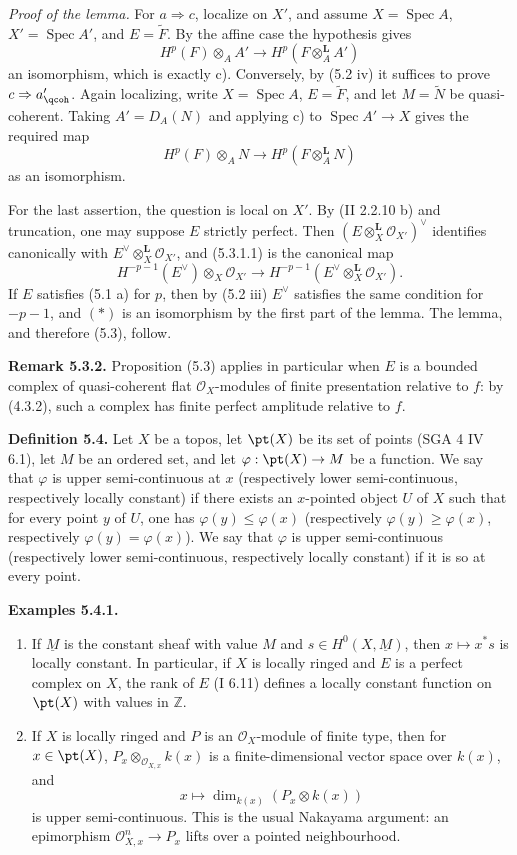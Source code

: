 \documentclass[11pt]{article}
\newcommand{\Spec}{\operatorname{Spec}}
\begin{document}
\emph{Proof of the lemma.} For \(a\Rightarrow c\), localize on \(X'\), and assume \(X=\Spec A\), \(X'=\Spec A'\), and \(E=\widetilde F\). By the affine case the hypothesis gives
\[
 H^p(F)\otimes_AA'
 \longrightarrow
 H^p(F\otimes_A^{\mathbf L}A')
\]
an isomorphism, which is exactly c). Conversely, by (5.2 iv) it suffices to prove \(c\Rightarrow a'_{\qcoh}\). Again localizing, write \(X=\Spec A\), \(E=\widetilde F\), and let \(M=\widetilde N\) be quasi-coherent. Taking \(A'=D_A(N)\) and applying c) to \(\Spec A'\to X\) gives the required map
\[
 H^p(F)\otimes_AN
 \longrightarrow
 H^p(F\otimes_A^{\mathbf L}N)
\]
as an isomorphism.

For the last assertion, the question is local on \(X'\). By (II 2.2.10 b) and truncation, one may suppose \(E\) strictly perfect. Then \((E\otimes_X^{\mathbf L}\mathcal O_{X'})^{\vee}\) identifies canonically with \(E^{\vee}\otimes_X^{\mathbf L}\mathcal O_{X'}\), and (5.3.1.1) is the canonical map
\[
 H^{-p-1}(E^{\vee})\otimes_X\mathcal O_{X'}
 \longrightarrow
 H^{-p-1}(E^{\vee}\otimes_X^{\mathbf L}\mathcal O_{X'}).
\tag{*}
\]
If \(E\) satisfies (5.1 a) for \(p\), then by (5.2 iii) \(E^{\vee}\) satisfies the same condition for \(-p-1\), and \((*)\) is an isomorphism by the first part of the lemma. The lemma, and therefore (5.3), follow.

\textbf{Remark 5.3.2.} Proposition (5.3) applies in particular when \(E\) is a bounded complex of quasi-coherent flat \(\mathcal O_X\)-modules of finite presentation relative to \(f\): by (4.3.2), such a complex has finite perfect amplitude relative to \(f\).

\textbf{Definition 5.4.} Let \(X\) be a topos, let \(\pt(X)\) be its set of points (SGA 4 IV 6.1), let \(M\) be an ordered set, and let \(\varphi:\pt(X)\to M\) be a function. We say that \(\varphi\) is upper semi-continuous at \(x\) (respectively lower semi-continuous, respectively locally constant) if there exists an \(x\)-pointed object \(U\) of \(X\) such that for every point \(y\) of \(U\), one has \(\varphi(y)\leq\varphi(x)\) (respectively \(\varphi(y)\geq\varphi(x)\), respectively \(\varphi(y)=\varphi(x)\)). We say that \(\varphi\) is upper semi-continuous (respectively lower semi-continuous, respectively locally constant) if it is so at every point.

\textbf{Examples 5.4.1.}
\begin{enumerate}[label=\alph*)]
\item If \(\underline M\) is the constant sheaf with value \(M\) and \(s\in H^0(X,\underline M)\), then \(x\mapsto x^*s\) is locally constant. In particular, if \(X\) is locally ringed and \(E\) is a perfect complex on \(X\), the rank of \(E\) (I 6.11) defines a locally constant function on \(\pt(X)\) with values in \(\mathbb Z\).
\item If \(X\) is locally ringed and \(P\) is an \(\mathcal O_X\)-module of finite type, then for \(x\in\pt(X)\), \(P_x\otimes_{\mathcal O_{X,x}}k(x)\) is a finite-dimensional vector space over \(k(x)\), and
\[
 x\longmapsto \dim_{k(x)}(P_x\otimes k(x))
\]
is upper semi-continuous. This is the usual Nakayama argument: an epimorphism \(\mathcal O_{X,x}^{n}\to P_x\) lifts over a pointed neighbourhood.
\end{enumerate}
\end{document}
